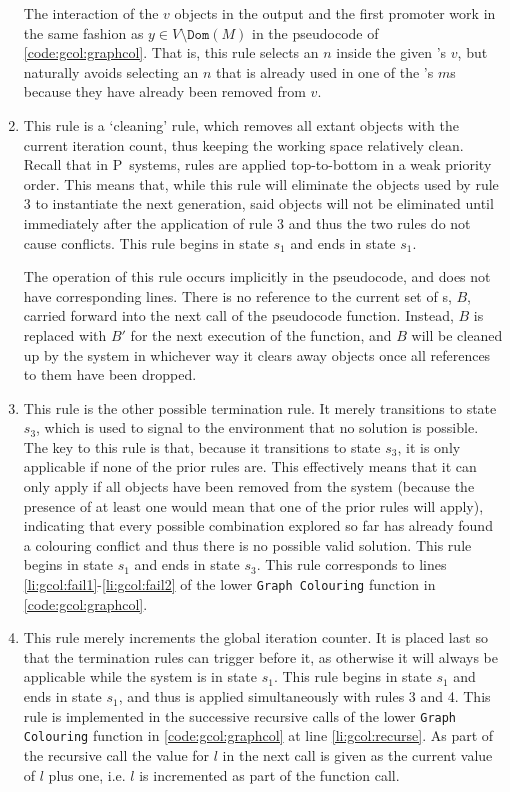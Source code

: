 \begin{enumerate}
The interaction of the \(v\) objects in the output and the first promoter work in the same fashion as \(y \in V \setminus \texttt{Dom}(M)\) in the pseudocode of \autoref{code:gcol:graphcol}.  That is, this rule selects an \(n\) inside the given \bo{}'s \(v\), but naturally avoids selecting an \(n\) that is already used in one of the \bo{}'s \(m\)s because they have already been removed from \(v\).

\item This rule is a `cleaning' rule, which removes all extant \bo{} objects with the current iteration count, thus keeping the working space relatively clean.  Recall that in P~systems, rules are applied top-to-bottom in a  weak priority order.  This means that, while this rule will eliminate the \bo{} objects used by rule 3 to instantiate the next generation, said objects will not be eliminated until immediately after the application of rule 3 and thus the two rules do not cause conflicts.  This rule begins in state \(s_1\) and ends in state \(s_1\).

The operation of this rule occurs implicitly in the pseudocode, and does not have corresponding lines.  There is no reference to the current set of \bo{}s, \(B\), carried forward into the next call of the pseudocode function.  Instead, \(B\) is replaced with \(B'\) for the next execution of the function, and \(B\) will be cleaned up by the system in whichever way it clears away objects once all references to them have been dropped.

\item This rule is the other possible termination rule.  It merely transitions to state \(s_3\), which is used to signal to the environment that no solution is possible.  The key to this rule is that, because it transitions to state \(s_3\), it is only applicable if none of the prior rules are.  This effectively means that it can only apply if all \bo{} objects have been removed from the system (because the presence of at least one \bo{} would mean that one of the prior rules will apply), indicating that every possible combination explored so far has already found a colouring conflict and thus there is no possible valid solution.  This rule begins in state \(s_1\) and ends in state \(s_3\).  This rule corresponds to lines \ref{li:gcol:fail1}-\ref{li:gcol:fail2} of the lower \texttt{Graph Colouring} function in \autoref{code:gcol:graphcol}.

\item This rule merely increments the global iteration counter.  It is placed last so that the termination rules can trigger before it, as otherwise it will always be applicable while the system is in state \(s_1\).  This rule begins in state \(s_1\) and ends in state \(s_1\), and thus is applied simultaneously with rules 3 and 4.  This rule is implemented in the successive recursive calls of the lower \texttt{Graph Colouring} function in \autoref{code:gcol:graphcol} at line \ref{li:gcol:recurse}.  As part of the recursive call the value for \(l\) in the next call is given as the current value of \(l\) plus one, i.e. \(l\) is incremented as part of the function call.
\end{enumerate}

